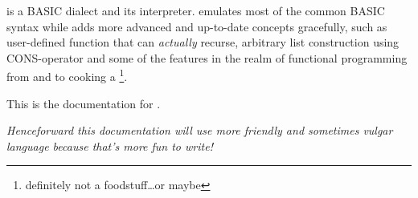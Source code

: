 \tbas{} is a BASIC dialect and its interpreter. \tbas{} emulates most of the common BASIC syntax while adds more advanced and up-to-date concepts gracefully, such as user-defined function that can \emph{actually} recurse, arbitrary list construction using CONS-operator and some of the features in the realm of functional programming from  and  to cooking a \footnote{definitely not a foodstuff\ldots or maybe}.

This is the documentation for \tbas{} \tbasver{}.

\small\emph{Henceforward this documentation will use more friendly and sometimes vulgar language because that's more fun to write!}
